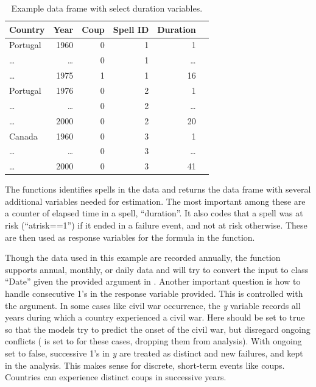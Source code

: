 \documentclass[article]{jss}
\begin{document}
\begin{table}
\begin{center}
\begin{tabular}{lrrrrr} \toprule
Country & Year & Coup & Spell ID & Duration \\ \midrule
Portugal & 1960 & 0 & 1 & 1  \\ 
\ldots & \ldots & 0 & 1 & \ldots \\
\ldots & 1975 & 1 & 1 & 16 \\ \midrule
Portugal & 1976 & 0 & 2 & 1 \\
\ldots & \ldots & 0 & 2 & \ldots \\
\ldots & 2000 & 0 & 2 & 20  \\ \midrule
Canada & 1960 & 0 & 3 & 1 \\
\ldots & \ldots & 0 & 3 & \ldots \\ 
\ldots & 2000 & 0 & 3 & 41 \\ \bottomrule
\end{tabular}
\end{center}
\caption{Example data frame with select duration variables.} \label{tab-ex}
\end{table}

The  functions identifies spells in the data and
returns the data frame with several additional variables needed for
estimation. The most important among these are a counter of elapsed time
in a spell, ``duration''. It also codes that a spell was at risk
(``atrisk==1'') if it ended in a failure event, and not at risk
otherwise. These are then used as response variables for the formula in
the  function.

Though the data used in this example are recorded annually, the function
supports annual, monthly, or daily data and will try to convert the
 input to class ``Date'' given the provided argument in
. Another important question is how to handle consecutive 1's
in the response variable provided. This is controlled with the
 argument. In some cases like civil war occurrence, the
\emph{y} variable records all years during which a country experienced a
civil war. Here  should be set to true so that the models
try to predict the onset of the civil war, but disregard ongoing
conflicts ( is set to  for these cases, dropping
them from analysis). With ongoing set to false, successive 1's in
\emph{y} are treated as distinct and new failures, and kept in the
analysis. This makes sense for discrete, short-term events like coups.
Countries can experience distinct coups in successive years.
\end{document}
